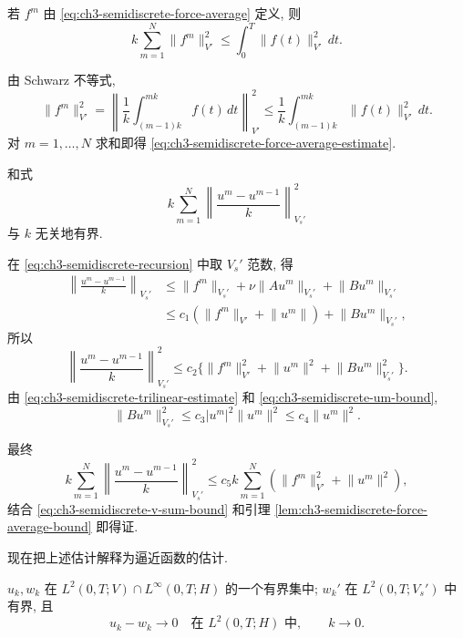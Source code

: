 \begin{Lemma}
\label{lem:ch3-semidiscrete-force-average-bound}
若 $f^m$ 由 \eqref{eq:ch3-semidiscrete-force-average} 定义, 则
\begin{equation}
k\sum_{m=1}^N\lVert f^m\rVert_{V'}^2
\leq\int_0^T\lVert f(t)\rVert_{V'}^2\,dt.
\label{eq:ch3-semidiscrete-force-average-estimate}
\end{equation}
\end{Lemma}

\begin{Proof}
由 Schwarz 不等式,
\[
\lVert f^m\rVert_{V'}^2
=\left\lVert\frac1k\int_{(m-1)k}^{mk}f(t)\,dt\right\rVert_{V'}^2
\leq\frac1k\int_{(m-1)k}^{mk}\lVert f(t)\rVert_{V'}^2\,dt.
\]
对 $m=1,\ldots,N$ 求和即得 \eqref{eq:ch3-semidiscrete-force-average-estimate}.
\end{Proof}

\begin{Lemma}
\label{lem:ch3-semidiscrete-time-difference-bound}
和式
\[
k\sum_{m=1}^N
\left\lVert\frac{u^m-u^{m-1}}k\right\rVert_{V_s'}^2
\]
与 $k$ 无关地有界.
\end{Lemma}

\begin{Proof}
在 \eqref{eq:ch3-semidiscrete-recursion} 中取 $V_s'$ 范数, 得
\[
\begin{aligned}
\left\lVert\frac{u^m-u^{m-1}}k\right\rVert_{V_s'}
&\leq\lVert f^m\rVert_{V_s'}+\nu\lVert Au^m\rVert_{V_s'}
+\lVert Bu^m\rVert_{V_s'}\\
&\leq c_1(\lVert f^m\rVert_{V'}+\lVert u^m\rVert)+\lVert Bu^m\rVert_{V_s'},
\end{aligned}
\]
所以
\[
\left\lVert\frac{u^m-u^{m-1}}k\right\rVert_{V_s'}^2
\leq c_2\{\lVert f^m\rVert_{V'}^2+\lVert u^m\rVert^2
+\lVert Bu^m\rVert_{V_s'}^2\}.
\]
由 \eqref{eq:ch3-semidiscrete-trilinear-estimate} 和 \eqref{eq:ch3-semidiscrete-um-bound},
\[
\lVert Bu^m\rVert_{V_s'}^2\leq c_3|u^m|^2\lVert u^m\rVert^2
\leq c_4\lVert u^m\rVert^2.
\]

\hypertarget{chapter-03-page-237}{}
最终
\[
k\sum_{m=1}^N
\left\lVert\frac{u^m-u^{m-1}}k\right\rVert_{V_s'}^2
\leq c_5k\sum_{m=1}^N(\lVert f^m\rVert_{V'}^2+\lVert u^m\rVert^2),
\]
结合 \eqref{eq:ch3-semidiscrete-v-sum-bound} 和引理 \ref{lem:ch3-semidiscrete-force-average-bound} 即得证.
\end{Proof}

现在把上述估计解释为逼近函数的估计.

\begin{Lemma}
\label{lem:ch3-semidiscrete-function-bounds}
$u_k,w_k$ 在 $L^2(0,T;V)\cap L^\infty(0,T;H)$ 的一个有界集中; $w_k'$ 在 $L^2(0,T;V_s')$ 中有界, 且
\begin{equation}
u_k-w_k\longrightarrow0\quad\text{在 }L^2(0,T;H)\text{ 中},
\qquad k\to0.
\label{eq:ch3-semidiscrete-uk-wk-convergence}
\end{equation}
\end{Lemma}

